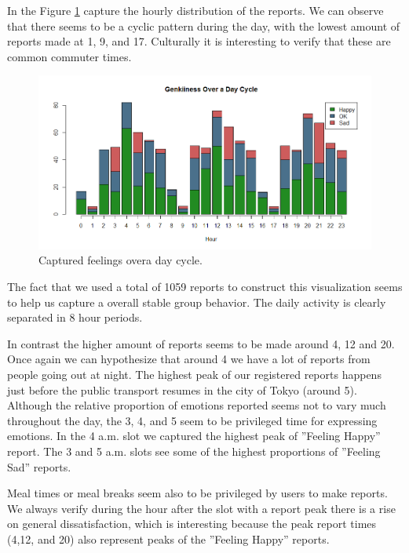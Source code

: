 \documentclass[letterpaper]{article}
\begin{document}
In the Figure \ref{fig:genkiioverday} capture the hourly distribution of the reports. We can observe that there seems to be a cyclic pattern during the day, with the lowest amount of reports made at 1, 9, and 17. Culturally it is interesting to verify that these are common commuter times. 
\begin{figure}[htb]
	\begin{center}
		\includegraphics[width=1\linewidth]{images/GenkioverDay}
		\caption{Captured feelings overa day cycle.\label{fig:genkiioverday}}
	\end{center}
\end{figure}

The fact that we used a total of 1059 reports to construct this visualization seems to help us capture a overall stable group behavior. The daily activity is clearly separated in 8 hour periods.

In contrast the higher amount of reports seems to be made around 4, 12 and 20. Once again we can hypothesize that around 4 we have a lot of reports from people going out at night. The highest peak of our registered reports happens just before the public transport resumes in the city of Tokyo (around 5). Although the relative proportion of emotions reported seems not to vary much throughout the day, the 3, 4, and 5 seem to be privileged time for expressing emotions. In the 4 a.m. slot we captured the highest peak of ''Feeling Happy'' report. The 3 and 5 a.m. slots see some of the highest proportions of ''Feeling Sad'' reports.

Meal times or meal breaks seem also to be privileged by users to make reports. 
We always verify during the hour after the slot with a report peak there is a rise on general dissatisfaction, which is interesting because the peak report times (4,12, and 20) also represent peaks of the ''Feeling Happy'' reports.
\end{document}
